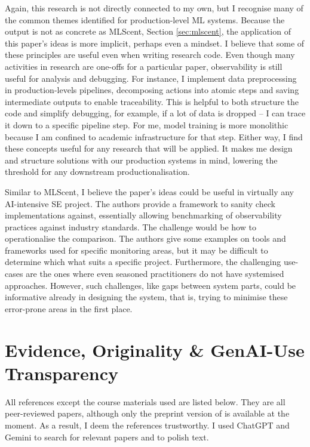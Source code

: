 \documentclass[11pt]{article}
\begin{document}
Again, this research is not directly connected to my own, but I recognise many of the common themes identified for production-level ML systems. Because the output is not as concrete as MLScent, Section \ref{sec:mlscent}, the application of this paper's ideas is more implicit, perhaps even a mindset. I believe that some of these principles are useful even when writing research code. Even though many activities in research are one-offs for a particular paper, observability is still useful for analysis and debugging. For instance, I implement data preprocessing in production-levels pipelines, decomposing actions into atomic steps and saving intermediate outputs to enable traceability. This is helpful to both structure the code and simplify debugging, for example, if a lot of data is dropped – I can trace it down to a specific pipeline step. For me, model training is more monolithic because I am confined to academic infrastructure for that step. Either way, I find these concepts useful for any research that will be applied. It makes me design and structure solutions with our production systems in mind, lowering the threshold for any downstream productionalisation.

Similar to MLScent, I believe the paper's ideas could be useful in virtually any AI-intensive SE project. The authors provide a framework to sanity check implementations against, essentially allowing benchmarking of observability practices against industry standards. The challenge would be how to operationalise the comparison. The authors give some examples on tools and frameworks used for specific monitoring areas, but it may be difficult to determine which what suits a specific project. Furthermore, the challenging use-cases are the ones where even seasoned practitioners do not have systemised approaches. However, such challenges, like gaps between system parts, could be informative already in designing the system, that is, trying to minimise these error-prone areas in the first place.

\section{Evidence, Originality \& GenAI-Use Transparency}
All references except the course materials used are listed below. They are all peer-reviewed papers, although only the preprint version of \citet{leestMonitoringObservabilityMachine2025} is available at the moment. As a result, I deem the references trustworthy. I used ChatGPT and Gemini to search for relevant papers and to polish text.


\end{document}
